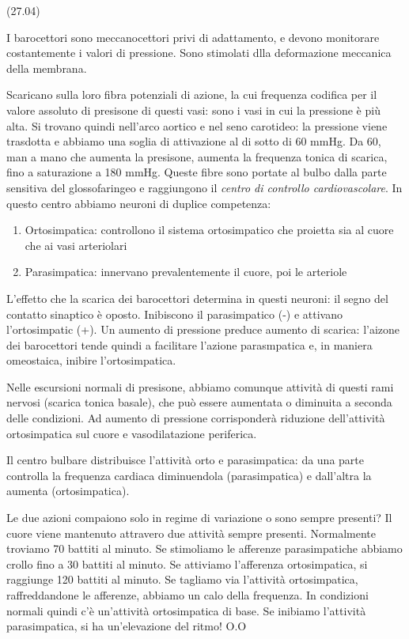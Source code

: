 \documentclass[a4paper,12pt]{article}
\begin{document}
(27.04)

I barocettori sono meccanocettori privi di adattamento, e devono monitorare costantemente i valori di pressione. Sono stimolati dlla deformazione meccanica della membrana.

Scaricano sulla loro fibra potenziali di azione, la cui frequenza codifica per il valore assoluto di presisone di questi vasi: sono i vasi in cui la pressione è più alta. Si trovano quindi nell'arco aortico e nel seno carotideo: la pressione viene trasdotta e abbiamo una soglia di attivazione al di sotto di 60 mmHg. Da 60, man a mano che aumenta la presisone, aumenta la frequenza tonica di scarica, fino a saturazione a 180 mmHg. Queste fibre sono portate al bulbo dalla parte sensitiva del glossofaringeo e raggiungono il \emph{centro di controllo cardiovascolare}. In questo centro abbiamo neuroni di duplice competenza:
\begin{enumerate}
\item{Ortosimpatica: controllono il sistema ortosimpatico che proietta sia al cuore che ai vasi arteriolari}
\item{Parasimpatica: innervano prevalentemente il cuore, poi le arteriole}
\end{enumerate}

L'effetto che la scarica dei barocettori determina in questi neuroni: il segno del contatto sinaptico è oposto. Inibiscono il parasimpatico (-) e attivano l'ortosimpatic (+). Un aumento di pressione preduce aumento di scarica: l'aizone dei barocettori tende quindi a facilitare l'azione parasmpatica e, in maniera omeostaica, inibire l'ortosimpatica.

Nelle escursioni normali di presisone, abbiamo comunque attività di questi rami nervosi (scarica tonica basale), che può essere aumentata o diminuita a seconda delle condizioni. Ad aumento di pressione corrisponderà riduzione dell'attività ortosimpatica sul cuore e vasodilatazione periferica. 

Il centro bulbare distribuisce l'attività orto e parasimpatica: da una parte controlla la frequenza cardiaca diminuendola (parasimpatica) e dall'altra la aumenta (ortosimpatica).

Le due azioni compaiono solo in regime di variazione o sono sempre presenti? Il cuore viene mantenuto attravero due attività sempre presenti. Normalmente troviamo 70 battiti al minuto. Se stimoliamo le afferenze parasimpatiche abbiamo crollo fino a 30 battiti al minuto. Se attiviamo l'afferenza ortosimpatica, si raggiunge 120 battiti al minuto. Se tagliamo via l'attività ortosimpatica, raffreddandone le afferenze, abbiamo un calo della frequenza. In condizioni normali quindi c'è un'attività ortosimpatica di base. Se inibiamo l'attività parasimpatica, si ha un'elevazione del ritmo! O.O
\end{document}
